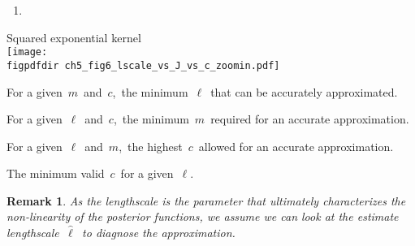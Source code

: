 \documentclass[portrait,a1,final]{a0poster} %
\newtheorem*{remark}{Remark}
\let\tempone\itemize
\let\temptwo\enditemize
\renewenvironment{itemize}{\tempone\addtolength{\itemsep}{-0.3\baselineskip}}{\temptwo}
\def\figpdfdir{fig/} %
\begin{document}
\begin{minipage}{1\linewidth}
\begin{minipage}[t]{0.48\textwidth}
\begin{enumerate}
\vspace{-3mm}
\item {}
\end{enumerate}

\vspace{3mm}
\hspace{-1cm}
\begin{minipage}{0.35\textwidth}
\hspace{0.25\textwidth} \scriptsize Squared exponential kernel\\
\texttt{[image: \\figpdfdir ch5\_fig6\_lscale\_vs\_J\_vs\_c\_zoomin.pdf]} \;\;

\end{minipage}
\begin{minipage}{0.65\textwidth}

\centering
\begin{tcolorbox}[colframe=blue!20, colback=white, title={\scriptsize This model says...}, colbacktitle=lightblue, coltitle=black, boxrule=0.5pt, width=0.975\textwidth]
\begin{itemize}\setlength\itemsep{1mm}
\item For a given\, $m$\, and\, $c$,\, the minimum\, $\ell$\, that can be accurately approximated.
\item For a given\, $\ell$\, and\, $c$,\, the minimum\, $m$\, required for an accurate approximation.
\item For a given\, $\ell$\, and\, $m$,\, the highest\, $c$\, allowed for an accurate approximation.
\item The minimum valid\, $c$\, for a given\, $\ell$.
\end{itemize}
\end{tcolorbox}
\end{minipage}

\vspace{-3mm}
{\centering
\begin{tcolorbox}[colframe=blue!20, colback=white, title={\scriptsize This model serves as a \textsc{\textbf{diagnosis tool}} of the approximation:}, colbacktitle=lightblue, coltitle=black, boxrule=0.5pt, width=0.98\textwidth]
\begin{remark}
As the lengthscale is the parameter that ultimately characterizes the non-linearity of the posterior functions, we assume we can look at the {\color{navyblue} estimate lengthscale}\, $\hat{\ell}$\, to diagnose the approximation.
\end{remark}


\end{tcolorbox}}
\end{minipage}
\end{minipage}
\end{document}
